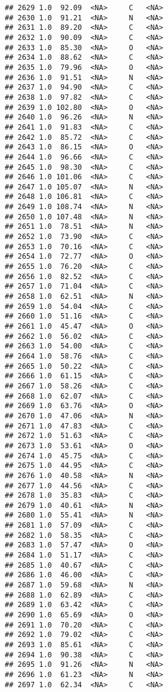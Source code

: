 \documentclass[
]{article}
\begin{document}
\begin{verbatim}
## 2629 1.0  92.09  <NA>     C   <NA>
## 2630 1.0  91.21  <NA>     N   <NA>
## 2631 1.0  89.20  <NA>     C   <NA>
## 2632 1.0  90.09  <NA>     C   <NA>
## 2633 1.0  85.30  <NA>     O   <NA>
## 2634 1.0  88.62  <NA>     C   <NA>
## 2635 1.0  79.96  <NA>     O   <NA>
## 2636 1.0  91.51  <NA>     N   <NA>
## 2637 1.0  94.90  <NA>     C   <NA>
## 2638 1.0  97.82  <NA>     C   <NA>
## 2639 1.0 102.80  <NA>     O   <NA>
## 2640 1.0  96.26  <NA>     N   <NA>
## 2641 1.0  91.83  <NA>     C   <NA>
## 2642 1.0  85.72  <NA>     C   <NA>
## 2643 1.0  86.15  <NA>     O   <NA>
## 2644 1.0  96.66  <NA>     C   <NA>
## 2645 1.0  98.30  <NA>     C   <NA>
## 2646 1.0 101.06  <NA>     C   <NA>
## 2647 1.0 105.07  <NA>     N   <NA>
## 2648 1.0 106.81  <NA>     C   <NA>
## 2649 1.0 108.74  <NA>     N   <NA>
## 2650 1.0 107.48  <NA>     N   <NA>
## 2651 1.0  78.51  <NA>     N   <NA>
## 2652 1.0  73.90  <NA>     C   <NA>
## 2653 1.0  70.16  <NA>     C   <NA>
## 2654 1.0  72.77  <NA>     O   <NA>
## 2655 1.0  76.20  <NA>     C   <NA>
## 2656 1.0  82.52  <NA>     C   <NA>
## 2657 1.0  71.04  <NA>     C   <NA>
## 2658 1.0  62.51  <NA>     N   <NA>
## 2659 1.0  54.04  <NA>     C   <NA>
## 2660 1.0  51.16  <NA>     C   <NA>
## 2661 1.0  45.47  <NA>     O   <NA>
## 2662 1.0  56.02  <NA>     C   <NA>
## 2663 1.0  54.00  <NA>     C   <NA>
## 2664 1.0  58.76  <NA>     C   <NA>
## 2665 1.0  50.22  <NA>     C   <NA>
## 2666 1.0  61.15  <NA>     C   <NA>
## 2667 1.0  58.26  <NA>     C   <NA>
## 2668 1.0  62.07  <NA>     C   <NA>
## 2669 1.0  63.76  <NA>     O   <NA>
## 2670 1.0  47.06  <NA>     N   <NA>
## 2671 1.0  47.83  <NA>     C   <NA>
## 2672 1.0  51.63  <NA>     C   <NA>
## 2673 1.0  53.61  <NA>     O   <NA>
## 2674 1.0  45.75  <NA>     C   <NA>
## 2675 1.0  44.95  <NA>     C   <NA>
## 2676 1.0  40.58  <NA>     N   <NA>
## 2677 1.0  44.56  <NA>     C   <NA>
## 2678 1.0  35.83  <NA>     C   <NA>
## 2679 1.0  40.61  <NA>     N   <NA>
## 2680 1.0  55.41  <NA>     N   <NA>
## 2681 1.0  57.09  <NA>     C   <NA>
## 2682 1.0  58.35  <NA>     C   <NA>
## 2683 1.0  57.47  <NA>     O   <NA>
## 2684 1.0  51.17  <NA>     C   <NA>
## 2685 1.0  40.67  <NA>     C   <NA>
## 2686 1.0  46.00  <NA>     C   <NA>
## 2687 1.0  59.68  <NA>     N   <NA>
## 2688 1.0  62.89  <NA>     C   <NA>
## 2689 1.0  63.42  <NA>     C   <NA>
## 2690 1.0  65.69  <NA>     O   <NA>
## 2691 1.0  70.20  <NA>     C   <NA>
## 2692 1.0  79.02  <NA>     C   <NA>
## 2693 1.0  85.61  <NA>     C   <NA>
## 2694 1.0  90.38  <NA>     C   <NA>
## 2695 1.0  91.26  <NA>     N   <NA>
## 2696 1.0  61.23  <NA>     N   <NA>
## 2697 1.0  62.34  <NA>     C   <NA>

\end{verbatim}
\end{document}
